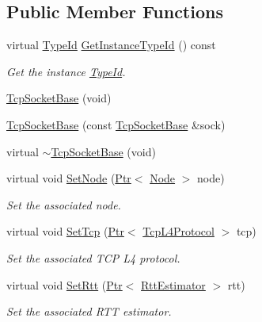 \subsection*{Public Member Functions}
\begin{DoxyCompactItemize}
\item 
virtual \hyperlink{classns3_1_1TypeId}{Type\+Id} \hyperlink{classns3_1_1TcpSocketBase_a37790b71ae253df6aea9f25b80657b67}{Get\+Instance\+Type\+Id} () const 
\begin{DoxyCompactList}\small\item\em Get the instance \hyperlink{classns3_1_1TypeId}{Type\+Id}. \end{DoxyCompactList}\item 
\hyperlink{classns3_1_1TcpSocketBase_a89e51540a8ac03d929349ae2ec56239b}{Tcp\+Socket\+Base} (void)
\item 
\hyperlink{classns3_1_1TcpSocketBase_a88ad90b1dca7d8a470225c9351198736}{Tcp\+Socket\+Base} (const \hyperlink{classns3_1_1TcpSocketBase}{Tcp\+Socket\+Base} \&sock)
\item 
virtual \hyperlink{classns3_1_1TcpSocketBase_a4b736ccb66957dbee78b4f7a27c082e4}{$\sim$\+Tcp\+Socket\+Base} (void)
\item 
virtual void \hyperlink{classns3_1_1TcpSocketBase_a1e1f8e39307c73a0d35aaa88a05caac1}{Set\+Node} (\hyperlink{classns3_1_1Ptr}{Ptr}$<$ \hyperlink{classns3_1_1Node}{Node} $>$ node)
\begin{DoxyCompactList}\small\item\em Set the associated node. \end{DoxyCompactList}\item 
virtual void \hyperlink{classns3_1_1TcpSocketBase_a283ba18630a9de25d561a884c66d9538}{Set\+Tcp} (\hyperlink{classns3_1_1Ptr}{Ptr}$<$ \hyperlink{classns3_1_1TcpL4Protocol}{Tcp\+L4\+Protocol} $>$ tcp)
\begin{DoxyCompactList}\small\item\em Set the associated T\+CP L4 protocol. \end{DoxyCompactList}\item 
virtual void \hyperlink{classns3_1_1TcpSocketBase_a520a55f6b7d9a02f06258928882ea3b6}{Set\+Rtt} (\hyperlink{classns3_1_1Ptr}{Ptr}$<$ \hyperlink{classns3_1_1RttEstimator}{Rtt\+Estimator} $>$ rtt)
\begin{DoxyCompactList}\small\item\em Set the associated R\+TT estimator. \end{DoxyCompactList}\item 

\end{DoxyCompactItemize}
